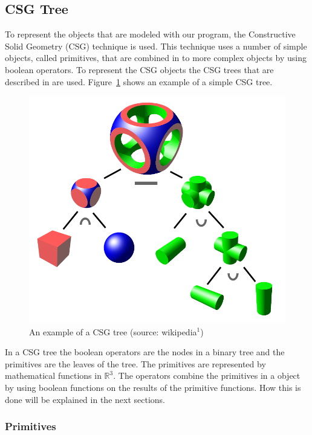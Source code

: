 \documentclass[a4wide,10pt,twocolumn]{article}
\begin{document}
\subsection{CSG Tree}
    To represent the objects that are modeled with our program, the Constructive Solid Geometry (CSG) technique is used. This technique uses a number of simple objects, called primitives, that are combined in to more complex objects by using boolean operators. To represent the CSG objects the CSG trees that are described in \cite{Wiegand96} are used. Figure~\ref{figure:csg_tree} shows an example of a simple CSG tree.

    \begin{figure}[h]
        \begin{center}
            \includegraphics[scale=.2]{./images/csgtree.png}
        \end{center}
        \caption{An example of a CSG tree (source: wikipedia$^1$)}
        \label{figure:csg_tree}
    \end{figure}

    In a CSG tree the boolean operators are the nodes in a binary tree and the primitives are the leaves of the tree. The primitives are represented by mathematical functions in $\mathbb{R}^3$. The operators combine the primitives in a object by using boolean functions on the results of the primitive functions. How this is done will be explained in the next sections.

\subsubsection{Primitives}
\end{document}
